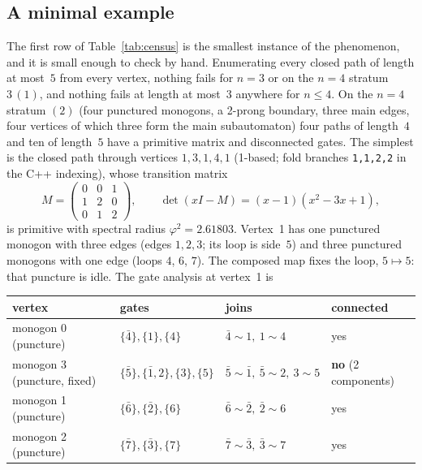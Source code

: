 \documentclass[12pt]{amsart}
\newcommand{\anti}[1]{\bar{#1}}          %
\newcommand{\code}[1]{\texttt{#1}}
\newcommand{\set}[1]{\{#1\}}
\theoremstyle{plain}
\theoremstyle{definition}
\begin{document}
\subsection{A minimal example}
\label{sec:minimal}
The first row of Table~\ref{tab:census} is the smallest instance of the
phenomenon, and it is small enough to check by hand.  Enumerating every
closed path of length at most~$5$ from every vertex, nothing fails for
$n=3$ or on the $n=4$ stratum $3\,(1)$, and nothing fails at length at
most~$3$ anywhere for $n\le4$.  On the $n=4$ stratum $(2)$ (four
punctured monogons, a 2-prong boundary, three main edges, four vertices
of which three form the main subautomaton) four paths of length~$4$ and
ten of length~$5$ have a primitive matrix and disconnected gates.  The
simplest is the closed path through vertices $1,3,1,4,1$ (1-based; fold
branches \code{1,1,2,2} in the C++ indexing), whose transition matrix
\[
  M=\begin{pmatrix} 0&0&1\\ 1&2&0\\ 0&1&2 \end{pmatrix},
  \qquad \det(xI-M)=(x-1)(x^2-3x+1),
\]
is primitive with spectral radius $\varphi^2=2.61803$.  Vertex~1 has one
punctured monogon with three edges (edges $1,2,3$; its loop is side~$5$)
and three punctured monogons with one edge (loops $4$, $6$, $7$).  The
composed map fixes the loop, $5\mapsto5$: that puncture is idle.  The
gate analysis at vertex~1 is

\begin{center}
  \small
  \begin{tabular}{@{}llll@{}}
    \toprule
    vertex & gates & joins & connected \\
    \midrule
    monogon 0 (puncture) & $\set{\anti4},\set{1},\set{4}$ & $\anti4\!\sim\!1,\ 1\!\sim\!4$ & yes \\
    monogon 3 (puncture, fixed) & $\set{\anti5},\set{\anti1,2},\set{3},\set{5}$
       & $\anti5\!\sim\!\anti1,\ \anti5\!\sim\!2,\ 3\!\sim\!5$ & \textbf{no} (2 components) \\
    monogon 1 (puncture) & $\set{\anti6},\set{\anti2},\set{6}$ & $\anti6\!\sim\!\anti2,\ \anti2\!\sim\!6$ & yes \\
    monogon 2 (puncture) & $\set{\anti7},\set{\anti3},\set{7}$ & $\anti7\!\sim\!\anti3,\ \anti3\!\sim\!7$ & yes \\
    \bottomrule
  \end{tabular}
\end{center}
\end{document}
